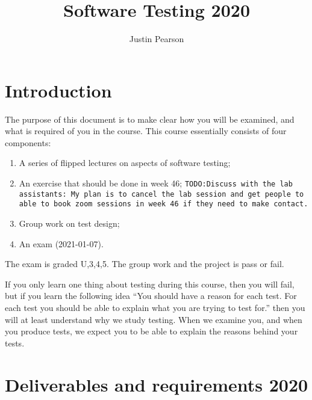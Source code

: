 \documentclass[a4paper]{article}
\title{Software Testing 2020}
\author{Justin Pearson }
\newcommand{\todo}[1]{{\tt TODO:#1}}
\begin{document}
\maketitle
\def\UrlBreaks{\do\/\do-} 

\section{Introduction}
The purpose of this document is to make clear how you will be examined, and
what is required of you in the course.  This course essentially consists of
four components:
\begin{enumerate}
\item A series of flipped lectures on aspects of software testing;

\item An exercise that should be done in week 46; \todo{Discuss with
    the lab assistants: My plan is to cancel the lab session and get
    people to able to book zoom sessions in week 46 if they need to
    make contact.}
\item Group work on test design;
\item An exam (2021-01-07).
\end{enumerate}
The exam is graded U,3,4,5. The group work and the project is pass or fail.

If you only learn one thing about testing during this course, then you
will fail, but if you learn the following idea ``You should have a
reason for each test. For each test you should be able to explain what
you are trying to test for.'' then you will at least understand why we
study testing. When we examine you, and when you produce tests, we
expect you to be able to explain the reasons behind your tests.


\section{Deliverables and requirements  2020}
\end{document}
